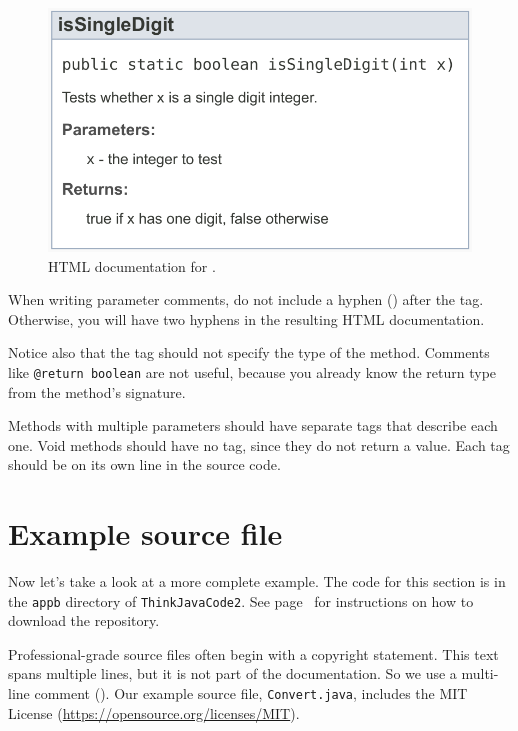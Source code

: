 \begin{figure}[!ht]
\begin{center}
\includegraphics[scale=0.8]{figs/javadoc.pdf}
\caption{HTML documentation for .}
\label{fig.javadoc}
\end{center}
\end{figure}

When writing parameter comments, do not include a hyphen (\java{-}) after the  tag.
Otherwise, you will have two hyphens in the resulting HTML documentation.

Notice also that the  tag should not specify the type of the method.
Comments like \textcolor{comment}{\tt @return boolean} are not useful, because you already know the return type from the method's signature.

Methods with multiple parameters should have separate  tags that describe each one.
Void methods should have no  tag, since they do not return a value.
Each tag should be on its own line in the source code.


\section{Example source file}

Now let's take a look at a more complete example.
The code for this section is in the {\tt appb} directory of {\tt ThinkJavaCode2}.
See page~\pageref{code} for instructions on how to download the repository.

Professional-grade source files often begin with a copyright statement.
This text spans multiple lines, but it is not part of the documentation.
So we use a multi-line comment (\java{/*}).
Our example source file, {\tt Convert.java}, includes the MIT License (\url{https://opensource.org/licenses/MIT}).

